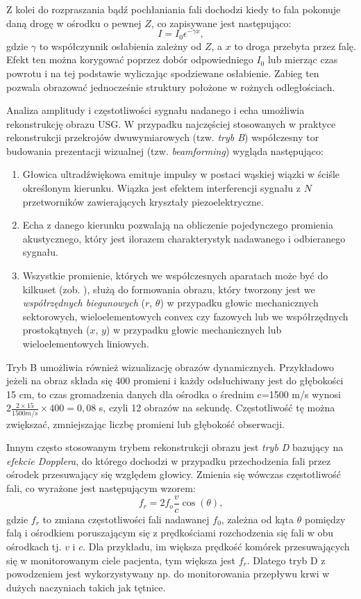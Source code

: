 Z kolei do rozpraszania bądź pochłaniania fali dochodzi kiedy to fala pokonuje daną drogę w ośrodku o pewnej $Z$, co zapisywane jest następująco:
\begin{equation}
I=I_0 \epsilon^{-\gamma x},
\end{equation}
gdzie $\gamma$ to współczynnik osłabienia zależny od $Z$, a $x$ to droga przebyta przez falę. Efekt ten można korygować poprzez dobór odpowiedniego $I_0$ lub mierząc czas powrotu i na tej podstawie wyliczając spodziewane osłabienie. Zabieg ten pozwala obrazować jednocześnie struktury położone w rożnych odległościach.

Analiza amplitudy i częstotliwości sygnału nadanego i echa umożliwia rekonstrukcję obrazu USG. W przypadku najczęściej stosowanych w praktyce rekonstrukcji przekrojów dwuwymiarowych (tzw. \textit{tryb B}) współczesny tor budowania prezentacji wizualnej (tzw. \textit{beamforming}) wygląda następująco: 
\begin{enumerate}
	\item Głowica ultradźwiękowa emituje impulsy w postaci wąskiej wiązki w ściśle określonym kierunku. Wiązka jest efektem interferencji sygnału z $N$ przetworników zawierających kryształy piezoelektryczne.
	\item Echa z danego kierunku pozwalają na obliczenie pojedynczego promienia akustycznego, który jest ilorazem charakterystyk nadawanego i odbieranego sygnału.
	\item Wszystkie promienie, których we współczesnych aparatach może być do kilkuset (zob. \cite{GEVoluson}), służą do formowania obrazu, który tworzony jest we \textit{współrzędnych biegunowych} ($r$, $\theta$) w przypadku głowic mechanicznych sektorowych, wieloelementowych convex czy fazowych lub we współrzędnych prostokątnych ($x$, $y$) w przypadku głowic mechanicznych lub wieloelementowych liniowych. 
\end{enumerate}

Tryb B umożliwia również wizualizację obrazów dynamicznych. Przykładowo jeżeli na obraz składa się 400 promieni i każdy odsłuchiwany jest do głębokości 15 cm, to czas gromadzenia danych dla ośrodka o średnim c=1500 m/s wynosi $2\frac{2\times15}{1500 m/s}\times400 = 0,08$ s, czyli 12 obrazów na sekundę. Częstotliwość tę można zwiększać, zmniejszając liczbę promieni lub głębokość obserwacji.

Innym często stosowanym trybem rekonstrukcji obrazu jest \textit{tryb D} bazujący na \textit{efekcie Dopplera}, do którego dochodzi w przypadku przechodzenia fali przez ośrodek przesuwający się względem głowicy. Zmienia się wówczas częstotliwość fali, co wyrażone jest następującym wzorem:
\begin{equation}
f_r = 2 f_o\frac{v}{c}\cos(\theta),
\end{equation} 
gdzie $f_r$ to zmiana częstotliwości fali nadawanej $f_0$, zależna od kąta $\theta$ pomiędzy falą i ośrodkiem poruszającym się z prędkościami rozchodzenia się fali w obu ośrodkach tj. $v$ i $c$. Dla przykładu, im większa prędkość komórek przesuwających się w monitorowanym ciele pacjenta, tym większa jest $f_r$. Dlatego tryb D z powodzeniem jest wykorzystywany np. do monitorowania przepływu krwi w dużych naczyniach takich jak tętnice.

